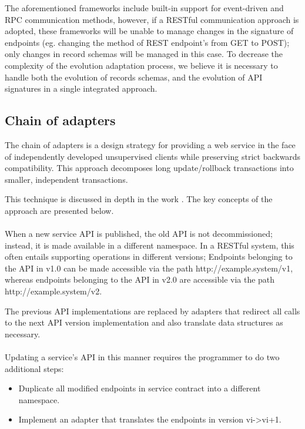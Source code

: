 The aforementioned frameworks include built-in support for event-driven and RPC communication methods,
however, if a RESTful communication approach is adopted, these frameworks will be unable to manage changes in the signature of endpoints
(eg. changing the method of REST endpoint's from GET to POST); only changes in record schemas will be managed in this case.
To decrease the complexity of the evolution adaptation process, we believe it is necessary to handle both the evolution of records schemas, and the evolution of API signatures in a single integrated approach.

\subsection{Chain of adapters} %
\label{sec:chain_of_adapters}

The chain of adapters is a design strategy for providing a web service in the face of independently developed unsupervised clients while preserving strict backwards compatibility.
This approach decomposes long update/rollback transactions into smaller, independent transactions.

This technique is discussed in depth in the work \cite{13}. The key concepts of the approach are presented below.

\paragraph{}

When a new service API is published, the old API is not decommissioned;
instead, it is made available in a different namespace.
In a RESTful system, this often entails supporting operations in different versions;
Endpoints belonging to the API in v1.0 can be made accessible via the path http://example.system/v1,
whereas endpoints belonging to the API in v2.0 are accessible via the path http://example.system/v2.

The previous API implementations are replaced by adapters that redirect all calls to the next API version implementation and also translate data structures as necessary.

\paragraph{}

Updating a service's API in this manner requires the programmer to do two additional steps:
\begin{itemize}
    \item Duplicate all modified endpoints in service contract into a different namespace.
    \item Implement an adapter that translates the endpoints in version vi->vi+1.
\end{itemize}

